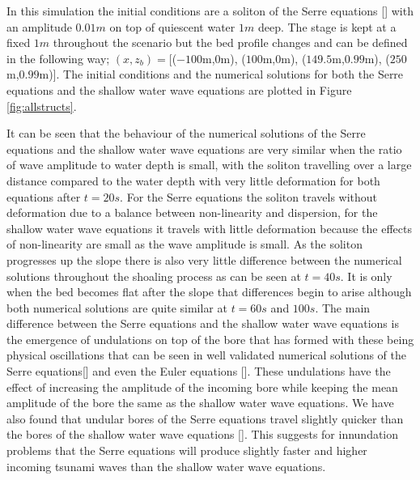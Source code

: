 \documentclass[a4paper,fleqn]{article} %
\begin{document}
In this simulation the initial conditions are a soliton of the Serre equations [] with an amplitude $0.01m$ on top of quiescent water $1m$ deep. The stage is kept at a fixed $1m$ throughout the scenario but the bed profile changes and can be defined in the following way; $(x,z_b) = [$($-100$m,$0$m), ($100$m,$0$m), ($149.5$m,$0.99$m), ($250$m,$0.99$m)$]$. The initial conditions and the numerical solutions for both the Serre equations and the shallow water wave equations are plotted in Figure \ref{fig:allstructs}.

It can be seen that the behaviour of the numerical solutions of the Serre equations and the shallow water wave equations are very similar when the ratio of wave amplitude to water depth is small, with the soliton travelling over a large distance compared to the water depth with very little deformation for both equations after $t=20s$. For the Serre equations the soliton travels without deformation due to a balance between non-linearity and dispersion, for the shallow water wave equations it travels with little deformation because the effects of non-linearity are small as the wave amplitude is small. As the soliton progresses up the slope there is also very little difference between the numerical solutions throughout the shoaling process as can be seen at $t=40s$. It is only when the bed becomes flat after the slope that differences begin to arise although both numerical solutions are quite similar at $t=60s$ and $100s$. The main difference between the Serre equations and the shallow water wave equations is the emergence of undulations on top of the bore that has formed with these being physical oscillations that can be seen in well validated numerical solutions of the Serre equations[] and even the Euler equations []. These undulations have the effect of increasing the amplitude of the incoming bore while keeping the mean amplitude of the bore the same as the shallow water wave equations. We have also found that undular bores of the Serre equations travel slightly quicker than the bores of the shallow water wave equations []. This suggests for innundation problems that the Serre equations will produce slightly faster and higher incoming tsunami waves than the shallow water wave equations. 


  
\end{document}

